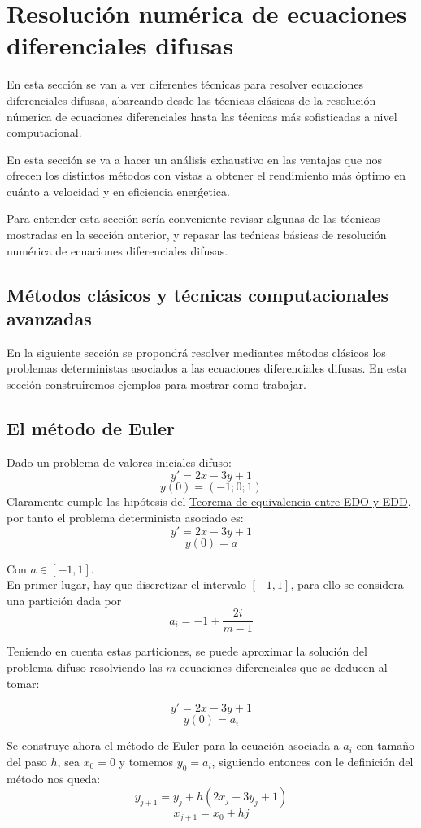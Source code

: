 \chapter{Resolución numérica de ecuaciones diferenciales difusas}
En esta sección se van a ver diferentes técnicas para resolver ecuaciones diferenciales difusas, abarcando desde las técnicas clásicas de la resolución númerica de ecuaciones diferenciales hasta las técnicas más sofisticadas a nivel computacional.

En esta sección se va a hacer un análisis exhaustivo en las ventajas que nos ofrecen los distintos métodos con vistas a obtener el rendimiento más óptimo en cuánto a velocidad y en eficiencia enerǵetica.

Para entender esta sección sería conveniente revisar algunas de las técnicas mostradas en la sección anterior, y repasar las tećnicas básicas de resolución numérica de ecuaciones diferenciales difusas.

\section{Métodos clásicos y técnicas computacionales avanzadas}
En la siguiente sección se propondrá resolver mediantes métodos clásicos los problemas deterministas asociados a las ecuaciones diferenciales difusas. En esta sección construiremos ejemplos para mostrar como trabajar.

\section{El método de Euler}
Dado un problema de valores iniciales difuso:
\[
	y' = 2x - 3y + 1
\]
\[
	y(0) = (-1;0;1)
\]
Claramente cumple las hipótesis del \hyperref[teorema:equivalencia]{Teorema de equivalencia entre EDO y EDD}, por tanto el problema determinista asociado es:
\[
	y' = 2x - 3y + 1
\]
\[
	y(0) = a
\]

Con $a \in [-1, 1]$. \\
En primer lugar, hay que discretizar el intervalo $[-1, 1]$, para ello se considera una partición dada por 
\[
	a_i = -1 + \frac{2i}{m-1}
\]

Teniendo en cuenta estas particiones, se puede aproximar la solución del problema difuso resolviendo las $m$ ecuaciones diferenciales que se deducen al tomar:

\[
	y' = 2x - 3y + 1
\]
\[
	y(0) = a_i
\]

Se construye ahora el método de Euler para la ecuación asociada a $a_i$ con tamaño del paso $h$, sea $x_0=0$ y tomemos $y_0 = a_i$, siguiendo entonces con le definición del método nos queda:
\[
	y_{j+1} = y_j + h (2x_j - 3y_j + 1)
\]
\[
	x_{j+1} = x_0 + hj
\]

